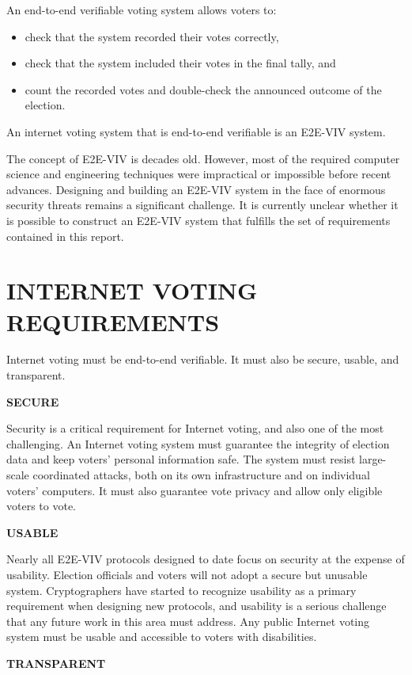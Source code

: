 An end-to-end verifiable voting system allows voters to:
\begin{itemize}
\item check that the system recorded their votes correctly,
\item check that the system included their votes in the final tally,
  and
\item count the recorded votes and double-check the announced outcome
  of the election.
\end{itemize}

An internet voting system that is end-to-end verifiable is an E2E-VIV
system.

The concept of E2E-VIV is decades old. However, most of the required
computer science and engineering techniques were impractical or
impossible before recent advances. Designing and building an E2E-VIV
system in the face of enormous security threats remains a significant
challenge. It is currently unclear whether it is possible to construct
an E2E-VIV system that fulfills the set of requirements contained in
this report.

\section*{INTERNET VOTING REQUIREMENTS}

Internet voting must be end-to-end verifiable. It must also be secure,
usable, and transparent.

\noindent \textbf{SECURE}

Security is a critical requirement for Internet voting, and also one
of the most challenging. An Internet voting system must guarantee the
integrity of election data and keep voters' personal information
safe. The system must resist large-scale coordinated attacks, both on
its own infrastructure and on individual voters' computers. It must
also guarantee vote privacy and allow only eligible voters to vote.

\noindent \textbf{USABLE}

Nearly all E2E-VIV protocols designed to date focus on security at the
expense of usability. Election officials and voters will not adopt a
secure but unusable system. Cryptographers have started to recognize
usability as a primary requirement when designing new protocols, and
usability is a serious challenge that any future work in this area
must address. Any public Internet voting system must be usable and
accessible to voters with disabilities.

\noindent \textbf{TRANSPARENT}

